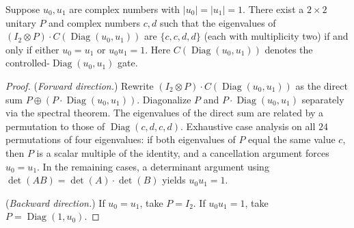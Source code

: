\begin{lemma}
  \label{lem:s3_3}
  \leanok
  Suppose $u_0, u_1$ are complex numbers with $|u_0| = |u_1| = 1$.
  There exist a $2 \times 2$ unitary $P$ and complex numbers $c, d$
  such that the eigenvalues of
  $(I_2 \otimes P) \cdot C(\operatorname{Diag}(u_0, u_1))$
  are $\{c, c, d, d\}$ (each with multiplicity two)
  if and only if either $u_0 = u_1$ or $u_0 u_1 = 1$.
  Here $C(\operatorname{Diag}(u_0, u_1))$ denotes the
  controlled-$\operatorname{Diag}(u_0, u_1)$ gate.
\end{lemma}

\begin{proof}
  \leanok
  (\emph{Forward direction.})
  Rewrite $(I_2 \otimes P) \cdot C(\operatorname{Diag}(u_0, u_1))$
  as the direct sum $P \oplus (P \cdot \operatorname{Diag}(u_0, u_1))$.
  Diagonalize $P$ and $P \cdot \operatorname{Diag}(u_0, u_1)$
  separately via the spectral theorem.
  The eigenvalues of the direct sum are related by a permutation
  to those of $\operatorname{Diag}(c, d, c, d)$.
  Exhaustive case analysis on all $24$ permutations of four eigenvalues:
  if both eigenvalues of $P$ equal the same value $c$,
  then $P$ is a scalar multiple of the identity,
  and a cancellation argument forces $u_0 = u_1$.
  In the remaining cases, a determinant argument
  using $\det(AB) = \det(A) \cdot \det(B)$ yields $u_0 u_1 = 1$.

  (\emph{Backward direction.})
  If $u_0 = u_1$, take $P = I_2$.
  If $u_0 u_1 = 1$, take $P = \operatorname{Diag}(1, u_0)$.
\end{proof}